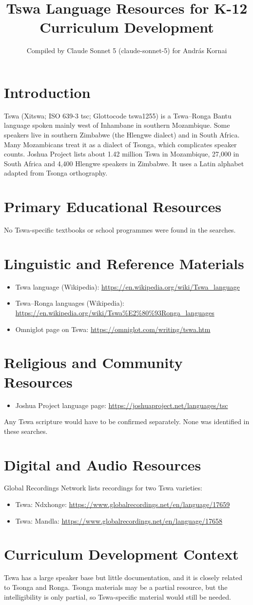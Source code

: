 \documentclass[12pt]{article}
\title{Tswa Language Resources for K-12 Curriculum Development}
\author{Compiled by Claude Sonnet 5 (claude-sonnet-5) for Andr\'as Kornai}
\date{}
\begin{document}
\maketitle

\section{Introduction}
Tswa (Xitswa; ISO 639-3 tsc; Glottocode tswa1255) is a Tswa--Ronga Bantu language spoken mainly west of Inhambane in southern Mozambique. Some speakers live in southern Zimbabwe (the Hlengwe dialect) and in South Africa. Many Mozambicans treat it as a dialect of Tsonga, which complicates speaker counts. Joshua Project lists about 1.42 million Tswa in Mozambique, 27,000 in South Africa and 4,400 Hlengwe speakers in Zimbabwe. It uses a Latin alphabet adapted from Tsonga orthography.

\section{Primary Educational Resources}
No Tswa-specific textbooks or school programmes were found in the searches.

\section{Linguistic and Reference Materials}
\begin{itemize}
\item Tswa language (Wikipedia): \url{https://en.wikipedia.org/wiki/Tswa_language}
\item Tswa--Ronga languages (Wikipedia): \url{https://en.wikipedia.org/wiki/Tswa%E2%80%93Ronga_languages}
\item Omniglot page on Tswa: \url{https://omniglot.com/writing/tswa.htm}
\end{itemize}

\section{Religious and Community Resources}
\begin{itemize}
\item Joshua Project language page: \url{https://joshuaproject.net/languages/tsc}
\end{itemize}
Any Tswa scripture would have to be confirmed separately. None was identified in these searches.

\section{Digital and Audio Resources}
Global Recordings Network lists recordings for two Tswa varieties:
\begin{itemize}
\item Tswa: Ndxhonge: \url{https://www.globalrecordings.net/en/language/17659}
\item Tswa: Mandla: \url{https://www.globalrecordings.net/en/language/17658}
\end{itemize}

\section{Curriculum Development Context}
Tswa has a large speaker base but little documentation, and it is closely related to Tsonga and Ronga. Tsonga materials may be a partial resource, but the intelligibility is only partial, so Tswa-specific material would still be needed.
\end{document}
